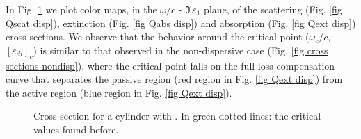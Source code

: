 \documentclass[9pt,twocolumn,twoside]{osajnl}
\begin{document}


In Fig. \ref{fig cross sections disp} we plot color maps, in the 
$\omega/c$ - $\Im\,\varepsilon_1$ plane, of the scattering (Fig. \ref{fig Qscat disp}), 
extinction (Fig. \ref{fig Qabs disp}) and absorption (Fig. \ref{fig Qext disp}) cross sections. 
We observe that the behavior around the critical point ($\omega_c/c$, $[\varepsilon_{di}]_c$)  is similar to that observed in the non-dispersive case (Fig. \ref{fig cross sections nondisp}), where the critical point falls on the full loss  compensation curve that separates the passive region (red region in Fig. \ref{fig Qext disp}) from the active region (blue region in Fig. \ref{fig Qext disp}).  

\begin{figure}[H]
    \centering
    \captionsetup[subfigure]{justification=centering}
    \captionsetup[subfigure]{justification=centering}
    \captionsetup[subfigure]{justification=centering}
    \caption{Cross-section for a cylinder with \threeDisp. In green dotted lines: the critical values found before.}
    \label{fig cross sections disp}
\end{figure}

\end{document}
